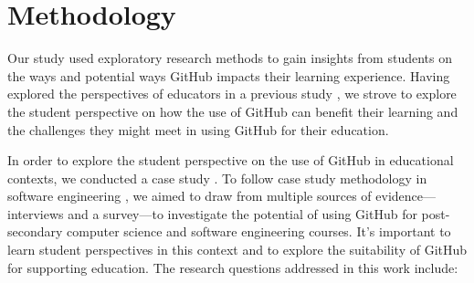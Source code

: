 \section{Methodology}
Our study used exploratory research methods \cite{easterbrook2008selecting} to gain insights from students on the ways and potential ways GitHub impacts their learning experience. Having explored the perspectives of educators in a previous study \cite{zagalsky2015emergence}, we strove to explore the student perspective on how the use of GitHub can benefit their learning and the challenges they might meet in using GitHub for their education.

In order to explore the student perspective on the use of GitHub in educational contexts, we conducted a case study \cite{yin2013case}. To follow case study methodology in software engineering \cite{runeson2012case}, we aimed to draw from multiple sources of evidence---interviews and a survey---to investigate the potential of using GitHub for post-secondary computer science and software engineering courses. It's important to learn student perspectives in this context and to explore the suitability of GitHub for supporting education. The research questions addressed in this work include:

%

